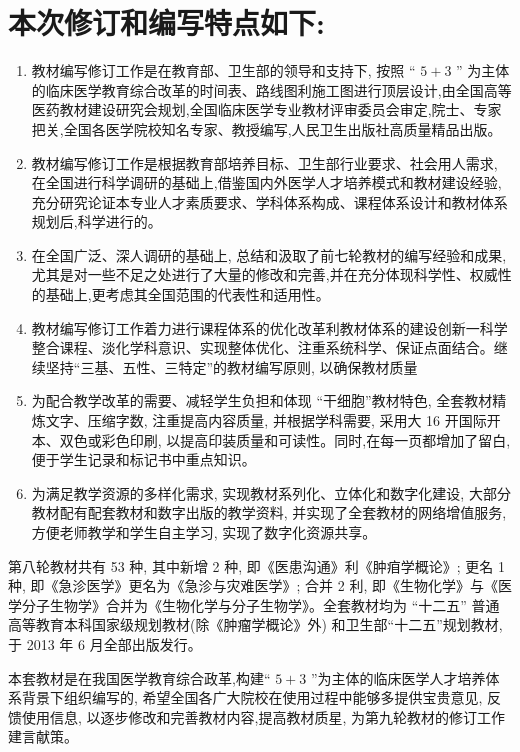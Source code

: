 \documentclass[10pt]{article}
\begin{document}
\section*{本次修订和编写特点如下:}
\begin{enumerate}
  \item 教材编写修订工作是在教育部、卫生部的领导和支持下, 按照 “ $5+3$ ” 为主体的临床医学教育综合改革的时间表、路线图利施工图进行顶层设计,由全国高等医药教材建设研究会规划,全国临床医学专业教材评审委员会审定,院士、专家把关,全国各医学院校知名专家、教授编写,人民卫生出版社高质量精品出版。

  \item 教材编写修订工作是根据教育部培养目标、卫生部行业要求、社会用人需求, 在全国进行科学调研的基础上,借鉴国内外医学人才培养模式和教材建设经验, 充分研究论证本专业人才素质要求、学科体系构成、课程体系设计和教材体系规划后,科学进行的。

  \item 在全国广泛、深人调研的基础上, 总结和汲取了前七轮教材的编写经验和成果, 尤其是对一些不足之处进行了大量的修改和完善,并在充分体现科学性、权威性的基础上,更考虑其全国范围的代表性和适用性。

  \item 教材编写修订工作着力进行课程体系的优化改革利教材体系的建设创新一科学整合课程、淡化学科意识、实现整体优化、注重系统科学、保证点面结合。继续坚持“三基、五性、三特定”的教材编写原则, 以确保教材质量

  \item 为配合教学改革的需要、减轻学生负担和体现 “干细胞”教材特色, 全套教材精炼文字、压缩字数, 注重提高内容质量, 并根据学科需要, 采用大 16 开国际开本、双色或彩色印刷, 以提高印装质量和可读性。同时,在每一页都增加了留白,便于学生记录和标记书中重点知识。

  \item 为满足教学资源的多样化需求, 实现教材系列化、立体化和数字化建设, 大部分教材配有配套教材和数字出版的教学资料, 并实现了全套教材的网络增值服务, 方便老师教学和学生自主学习, 实现了数字化资源共享。

\end{enumerate}

第八轮教材共有 53 种, 其中新增 2 种, 即《医患沟通》利《肿㾇学概论》; 更名 1 种, 即《急沴医学》更名为《急沴与灾难医学》; 合并 2 利, 即《生物化学》与《医学分子生物学》合并为《生物化学与分子生物学》。全套教材均为 “十二五” 普通高等教育本科国家级规划教材(除《肿瘤学概论》外) 和卫生部“十二五”规划教材, 于 2013 年 6 月全部出版发行。

本套教材是在我国医学教育综合政革,构建“ $5+3$ ”为主体的临床医学人才培养体系背景下组织编写的, 希望全国各广大院校在使用过程中能够多提供宝贵意见, 反馈使用信息, 以逐步修改和完善教材内容,提高教材质星, 为第九轮教材的修订工作建言献策。
\end{document}
